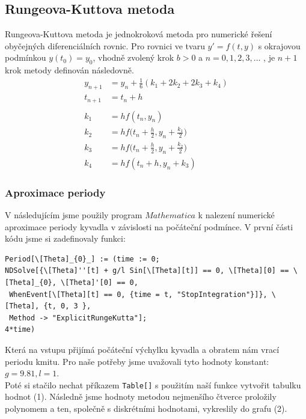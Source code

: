 \documentclass[reqno, a4paper]{amsart}
\begin{document}
\subsection{Rungeova-Kuttova metoda}
\label{sec:Rungeova-Kuttova metoda}

Rungeova-Kuttova metoda je jednokroková metoda pro numerické řešení obyčejných diferenciálních rovnic. Pro rovnici ve tvaru \( y'= f(t,y)\) s okrajovou podmínkou \(y(t_0)=y_0 \), vhodně zvolený krok \(b>0\) a \(n = 0, 1, 2, 3, ...\) , je $n+1$ krok metody definován následovně.
\begin{align*}
y_{n+1} &= y_n + \frac{1}{6} (k_1 + 2k_2 +2k_3 +k_4) \\
t_{n+1} &= t_n +h \\ \\
k_1 &= h f(t_n,y_n) \\
k_2 &= h f\Big(t_n + \frac{h}{2},y_n + \frac{k_1}{2}\Big) \\
k_3 &= h f\Big(t_n + \frac{h}{2},y_n + \frac{k_2}{2}\Big) \\
k_4 &= h f(t_n + h ,y_n + k_3) 
\end{align*}

\subsubsection{Aproximace periody}
\label{sec:aprox-periody}
V následujícím jsme použily program $Mathematica$ k nalezení numerické aproximace periody kyvadla v závislosti na počáteční podmínce.
V první části kódu jsme si zadefinovaly funkci:
\begin{verbatim}
Period[\[Theta]_{0}_] := (time := 0; 
NDSolve[{\[Theta]''[t] + g/l Sin[\[Theta][t]] == 0, \[Theta][0] == \[Theta]_{0}, \[Theta]'[0] == 0, 
 WhenEvent[\[Theta][t] == 0, {time = t, "StopIntegration"}]}, \[Theta], {t, 0, 3 },
 Method -> "ExplicitRungeKutta"];
4*time)
\end{verbatim}
Která na vstupu přijímá počáteční výchylku kyvadla a obratem nám vrací periodu kmitu. Pro naše potřeby jsme uvažovali tyto hodnoty konstant: $g=9.81, l=1$.\\
Poté si stačilo nechat příkazem \verb|Table[]| s použitím naší funkce vytvořit tabulku hodnot (1). Následně jsme hodnoty metodou nejmenšího čtverce proložily polynomem a ten, společně s diskrétními hodnotami, vykreslily do grafu (2). 
\end{document}
